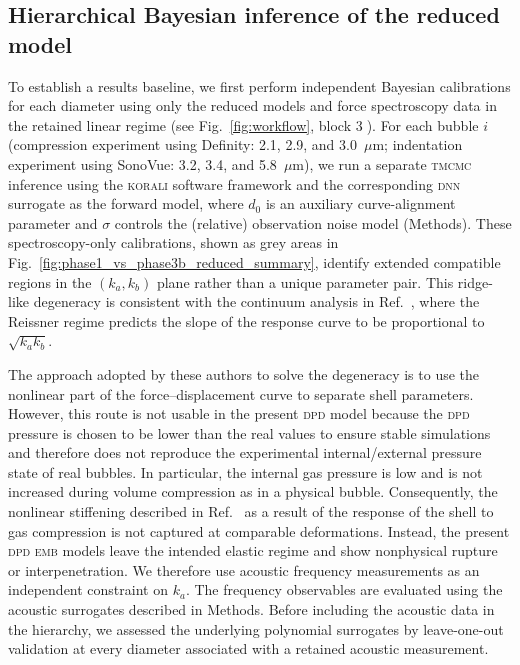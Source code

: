 \documentclass[%
 aip,
 jcp,
 amsmath,amssymb,
 preprint,%
]{revtex4-1}
\begin{document}
\subsection{Hierarchical Bayesian inference of the reduced model}
\label{sec:res:phase1}
To establish a results baseline, we first perform independent Bayesian calibrations for each diameter using only the reduced models and force spectroscopy data in the retained linear regime (see Fig.~\ref{fig:workflow}, block \textcircled{3}). For each bubble $i$ (compression experiment using Definity: 2.1, 2.9, and 3.0~$\mu$m; indentation experiment using SonoVue: 3.2, 3.4, and 5.8~$\mu$m), we run a separate \textsc{tmcmc} inference using the \textsc{korali} software framework \cite{martin2022korali} and the corresponding \textsc{dnn} surrogate as the forward model, where $d_0$ is an auxiliary curve-alignment parameter and $\sigma$ controls the (relative) observation noise model (Methods). These spectroscopy-only calibrations, shown as grey areas in Fig.~\ref{fig:phase1_vs_phase3b_reduced_summary}, identify extended compatible regions in the $(k_a,k_b)$ plane rather than a unique parameter pair. This ridge-like degeneracy is consistent with the continuum analysis in Ref.~\cite{lytra2020modeling}, where the Reissner regime predicts the slope of the response curve to be proportional to $\sqrt{k_a k_b}$. 

The approach adopted by these authors to solve the degeneracy is to use the nonlinear part of the force--displacement curve to separate shell parameters.
However, this route is not usable in the present \textsc{dpd} model because the \textsc{dpd} pressure is chosen to be lower than the real values to ensure stable simulations and therefore does not reproduce the experimental internal/external pressure state of real bubbles. In particular, the internal gas pressure is low and is not increased during volume compression as in a physical bubble. Consequently, the nonlinear stiffening described in Ref.~\cite{lytra2020modeling} as a result of the response of the shell to gas compression is not captured at comparable deformations. Instead, the present \textsc{dpd} \textsc{emb} models leave the intended elastic regime and show nonphysical rupture or interpenetration. We therefore use acoustic frequency measurements as an independent constraint on $k_a$. The frequency observables are evaluated using the acoustic surrogates described in Methods. Before including the acoustic data in the hierarchy, we assessed the underlying polynomial surrogates by leave-one-out validation at every diameter associated with a retained acoustic measurement.
\end{document}
